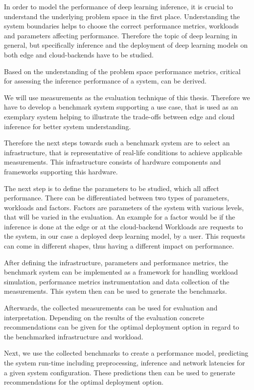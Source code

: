 In order to model the performance of deep learning inference, it is crucial to understand the underlying problem space in the first place.
Understanding the system boundaries helps to choose the correct performance metrics, workloads and parameters affecting performance.
Therefore the topic of deep learning in general, but specifically inference and the deployment of deep learning models on both edge and cloud-backends have to be studied.

Based on the understanding of the problem space performance metrics, critical for assessing the inference performance of a system, can be derived.

We will use measurements as the evaluation technique of this thesis. 
Therefore we have to develop a benchmark system supporting a use case, that is used as an exemplary system helping to illustrate the trade-offs between edge and cloud inference for better system understanding.

Therefore the next steps towards such a benchmark system are to select an infrastructure, that is representative of real-life conditions to achieve applicable measurements. 
This infrastructure consists of hardware components and frameworks supporting this hardware. 

The next step is to define the parameters to be studied, which all affect performance.
There can be differentiated between two types of parameters, workloads and factors.
Factors are parameters of the system with various levels, that will be varied in the evaluation. An example for a factor would be if the inference is done at the edge or at the cloud-backend
Workloads are requests to the system, in our case a deployed deep learning model, by a user.
This requests can come in different shapes, thus having a different impact on performance.



After defining the infrastructure, parameters and performance metrics, the benchmark system can be implemented as a framework for handling workload simulation, performance metrics instrumentation and data collection of the measurements.
This system then can be used to generate the benchmarks. 

Afterwards, the collected measurements can be used for evaluation and interpretation.
Depending on the results of the evaluation concrete recommendations can be given for the optimal deployment option in regard to the benchmarked infrastructure and workload.

Next, we use the collected benchmarks to create a performance model, predicting the system run-time including preprocessing, inference and network latencies for a given system configuration.
These predictions then can be used to generate recommendations for the optimal deployment option.

